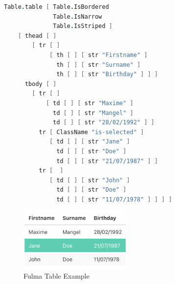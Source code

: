 \begin{lstlisting}[language=FSharp, caption={Simple F\fsharp code for generating a table with Fulma \cite{fulmatable}}, captionpos=b, label={lst:fulmatable}]
    Table.table [ Table.IsBordered
              Table.IsNarrow
              Table.IsStriped ]
    [ thead [ ]
        [ tr [ ]
             [ th [ ] [ str "Firstname" ]
               th [ ] [ str "Surname" ]
               th [ ] [ str "Birthday" ] ] ]
      tbody [ ]
        [ tr [ ]
            [ td [ ] [ str "Maxime" ]
              td [ ] [ str "Mangel" ]
              td [ ] [ str "28/02/1992" ] ]
          tr [ ClassName "is-selected" ]
             [ td [ ] [ str "Jane" ]
               td [ ] [ str "Doe" ]
               td [ ] [ str "21/07/1987" ] ]
          tr [  ]
             [ td [ ] [ str "John" ]
               td [ ] [ str "Doe" ]
               td [ ] [ str "11/07/1978" ] ] ] ]
\end{lstlisting}

\begin{figure} [h]
    \centering
    \includegraphics[width=0.5\textwidth]{02.Background/Fulma Table.png}
    \caption{Fulma Table Example}
    \label{fig:fulmatable}
\end{figure}


